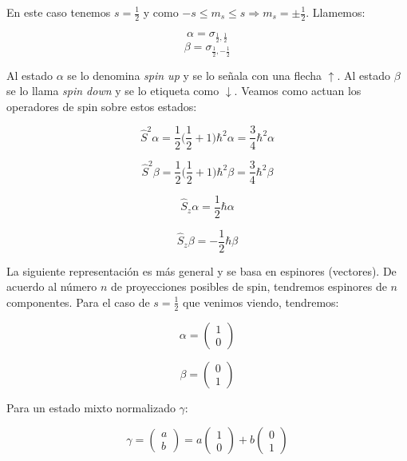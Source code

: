 \documentclass[a4paper]{article}
\begin{document}
En este caso tenemos $s = \frac{1}{2}$ y como $-s \leq m_{s} \leq s \Rightarrow m_{s} = \pm \frac{1}{2}$. Llamemos:

$$\alpha = \sigma_{\frac{1}{2},\frac{1}{2}}$$
$$\beta = \sigma_{\frac{1}{2},-\frac{1}{2}}$$

Al estado $\alpha$ se lo denomina \textit{spin up} y se lo se\~nala con una flecha $\uparrow$. Al estado $\beta$ se lo llama \textit{spin down} y se lo etiqueta como $\downarrow$. Veamos como actuan los operadores de spin sobre estos estados:

\begin{equation}
\label{eq:S2up}
\hat{S}^{2}\alpha = \frac{1}{2}\bigg(\frac{1}{2} + 1 \bigg)\hbar^{2}\alpha = \frac{3}{4}\hbar^{2}\alpha
\end{equation}

\begin{equation}
\label{eq:S2down}
\hat{S}^{2}\beta = \frac{1}{2}\bigg(\frac{1}{2} + 1 \bigg)\hbar^{2}\beta = \frac{3}{4}\hbar^{2}\beta
\end{equation}

\begin{equation}
\label{eq:Szup}
\hat{S}_{z}\alpha = \frac{1}{2}\hbar \alpha
\end{equation}

\begin{equation}
\label{eq:Szdown}
\hat{S}_{z}\beta = -\frac{1}{2}\hbar \beta
\end{equation}

La siguiente representaci\'on es m\'as general y se basa en espinores (vectores). De acuerdo al n\'umero $n$ de proyecciones posibles de spin, tendremos espinores de $n$ componentes. Para el caso de $s = \frac{1}{2}$ que venimos viendo, tendremos:

$$\alpha = \begin{pmatrix} 
    		1 \\ 
    		0 
    		\end{pmatrix}  $$
		
$$\beta = \begin{pmatrix} 
    		0 \\ 
    		1 
    		\end{pmatrix}  $$

Para un estado mixto normalizado $\gamma$:

$$\gamma =  \begin{pmatrix}a \\ b \end{pmatrix} = a\begin{pmatrix}1 \\ 0 \end{pmatrix} + b \begin{pmatrix}0 \\ 1 \end{pmatrix}$$
\end{document}
